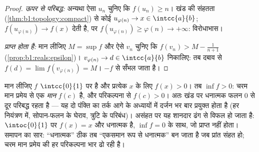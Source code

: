 \begin{proof}
\emph{ऊपर से परिबद्ध:} अन्यथा ऐसा $u_n$ चुनिए कि $f(u_n) \geq n$। खंड की
संहतता (\cref{thm:b1:topology:compact}) से कोई  $u_{\varphi(n)} \to
x \in \intcc{a}{b}$;  $f(u_{\varphi(n)}) \to f(x)$ देती है, पर
$f(u_{\varphi(n)}) \geq \varphi(n) \to +\infty$: विरोधाभास।

\emph{ प्राप्त होता है:} मान लीजिए $M = \sup f$ और ऐसे $v_n$ चुनिए कि
$f(v_n) > M - \frac{1}{n+1}$ (\cref{prop:b1:reals:epsilon})। $v_{\varphi(n)}
\to d \in \intcc{a}{b}$ निकालिए: तब दबाव से $f(d) = \lim f(v_{\varphi(n)}) =
M$।  $-f$ से सँभल जाता है।
\end{proof}

\begin{example}[खंड पर धनात्मक न्यूनतम]\label{ex:b1:continuity:posmin}
मान लीजिए $f$ $\intcc{0}{1}$ पर  है और प्रत्येक $x$ के लिए $f(x) > 0$।
तब $\inf f > 0$: चरम मान प्रमेय से  एक \emph{मान} $f(c)$ है, और
परिकल्पना से $f(c) > 0$। अतः खंड पर  धनात्मक फलन $0$ से दूर परिबद्ध रहता
है --- यह दो पंक्ति का तर्क आगे के अध्यायों में दर्जन भर बार प्रयुक्त होता
है (हर नियंत्रण में, सोपान-फलन के घेराव, त्रुटि के परिबंध)। असंहत  पर
यह शानदार ढंग से विफल हो जाता है: $\intoc{0}{1}$ पर $f(x) = x$  और
धनात्मक है, $\inf f = 0$ के साथ, जो प्राप्त नहीं होता। समापन का सार:
``धनात्मक'' ठीक तब ``एकसमान रूप से धनात्मक'' बन जाता है जब प्रांत संहत हो;
चरम मान प्रमेय की हर परिकल्पना भार ढो रही है।
\end{example}

